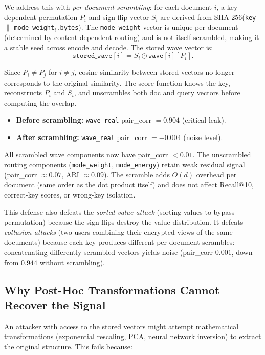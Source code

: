 \documentclass{article}
\begin{document}
We address this with \emph{per-document scrambling}: for each document $i$, a key-dependent permutation $P_i$ and sign-flip vector $S_i$ are derived from SHA-256(\texttt{key} $\|$ \texttt{mode\_weight}$_i$\texttt{.bytes}).
The \texttt{mode\_weight} vector is unique per document (determined by content-dependent routing) and is not itself scrambled, making it a stable seed across encode and decode.
The stored wave vector is:
\[
  \texttt{stored\_wave}[i] = S_i \odot \texttt{wave}[i][P_i].
\]

Since $P_i \neq P_j$ for $i \neq j$, cosine similarity between stored vectors no longer corresponds to the original similarity.
The score function knows the key, reconstructs $P_i$ and $S_i$, and unscrambles both doc and query vectors before computing the overlap.

\begin{itemize}[nosep]
  \item \textbf{Before scrambling:} \texttt{wave\_real} pair\_corr $= 0.904$ (critical leak).
  \item \textbf{After scrambling:} \texttt{wave\_real} pair\_corr $= -0.004$ (noise level).
\end{itemize}

All scrambled wave components now have pair\_corr $< 0.01$.
The unscrambled routing components (\texttt{mode\_weight}, \texttt{mode\_energy}) retain weak residual signal (pair\_corr $\approx 0.07$, ARI $\approx 0.09$).
The scramble adds $O(d)$ overhead per document (same order as the dot product itself) and does not affect Recall@10, correct-key scores, or wrong-key isolation.

This defense also defeats the \emph{sorted-value attack} (sorting values to bypass permutation) because the sign flips destroy the value distribution.
It defeats \emph{collusion attacks} (two users combining their encrypted views of the same documents) because each key produces different per-document scrambles: concatenating differently scrambled vectors yields noise (pair\_corr $0.001$, down from $0.944$ without scrambling).

\subsection{Why Post-Hoc Transformations Cannot Recover the Signal}

An attacker with access to the stored vectors might attempt mathematical transformations (exponential rescaling, PCA, neural network inversion) to extract the original structure.
This fails because:
\end{document}
